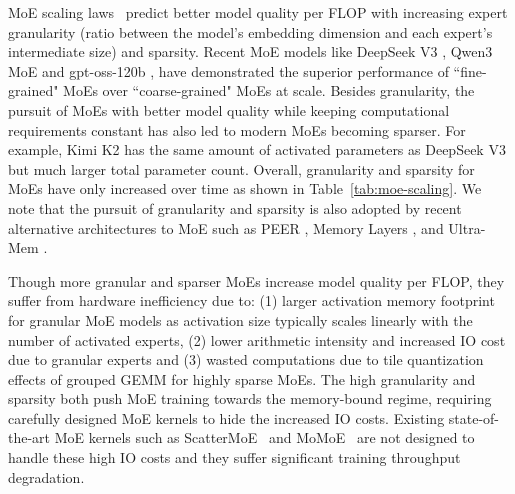 
MoE scaling laws~\citep{clark2022unified,krajewski2024scaling,tian2025towards} predict
better model quality per FLOP with increasing expert granularity (ratio between the model's embedding dimension and each expert's intermediate size) and sparsity.
Recent MoE models like DeepSeek V3 \citep{deepseekai2025deepseekv3technicalreport}, Qwen3 MoE \citep{qwen3_2024} and gpt-oss-120b \citep{openai2025gptoss120bgptoss20bmodel}, have demonstrated the superior performance of ``fine-grained" MoEs over ``coarse-grained" MoEs at scale. Besides granularity, the pursuit of MoEs with better model quality while keeping computational requirements constant has also led to modern MoEs becoming sparser. For example, Kimi K2 \citep{kimiteam2025kimik2openagentic} has the same amount of activated parameters as DeepSeek V3 \citep{deepseekai2025deepseekv3technicalreport} but much larger total parameter count. Overall, granularity and sparsity for MoEs have only increased over time as shown in Table~\ref{tab:moe-scaling}. We note that the pursuit of granularity and sparsity is also adopted by recent alternative architectures to MoE such as PEER \citep{he2024mixture}, Memory Layers \citep{berges2024memory}, and Ultra-Mem \citep{huangultra}. 



Though more granular and sparser MoEs increase model quality per FLOP, they suffer from hardware inefficiency due to: (1) larger activation memory footprint for granular MoE models as activation size typically scales linearly with the number of activated experts, (2) lower arithmetic intensity and increased IO cost due to granular experts and (3) wasted computations due to tile quantization effects of grouped GEMM for highly sparse MoEs. The high granularity and sparsity both push MoE training towards the memory-bound regime, requiring carefully designed MoE kernels to hide the increased IO costs. Existing state-of-the-art MoE kernels such as ScatterMoE~\citep{tan2024scattered} and MoMoE~\citep{costin2025momoe} are not designed to handle these high IO costs and they suffer significant training throughput degradation. 


